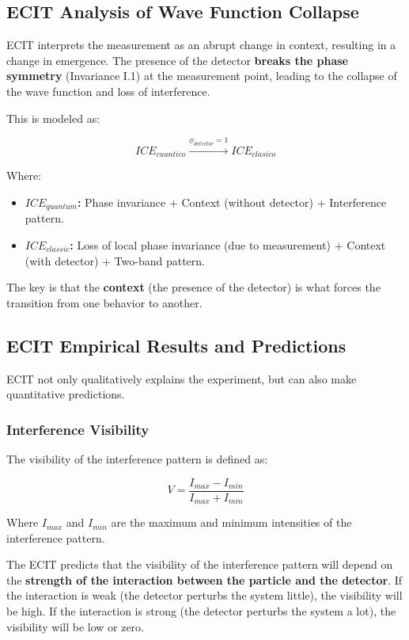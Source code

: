 \documentclass{article}
\begin{document}
\subsection{ECIT Analysis of Wave Function Collapse}

ECIT interprets the measurement as an abrupt change in context, resulting in a change in emergence. The presence of the detector \textbf{breaks the phase symmetry} (Invariance I.1) at the measurement point, leading to the collapse of the wave function and loss of interference.

This is modeled as:

$$ ICE_{cuantico} \xrightarrow{\phi_{detector} = 1} ICE_{clasico} $$

Where:

\begin{itemize}
\item \textbf{\(ICE_{quantum}\):} Phase invariance + Context (without detector) + Interference pattern.

\item \textbf{\(ICE_{classic}\):} Loss of local phase invariance (due to measurement) + Context (with detector) + Two-band pattern.
\end{itemize}
The key is that the \textbf{context} (the presence of the detector) is what forces the transition from one behavior to another.

\subsection{ECIT Empirical Results and Predictions}

ECIT not only qualitatively explains the experiment, but can also make quantitative predictions.

\subsubsection{Interference Visibility}

The visibility of the interference pattern is defined as:

$$ V = \frac{I_{max} - I_{min}}{I_{max} + I_{min}} $$

Where \(I_{max}\) and \(I_{min}\) are the maximum and minimum intensities of the interference pattern.

The ECIT predicts that the visibility of the interference pattern will depend on the \textbf{strength of the interaction between the particle and the detector}. If the interaction is weak (the detector perturbs the system little), the visibility will be high. If the interaction is strong (the detector perturbs the system a lot), the visibility will be low or zero.
\end{document}
